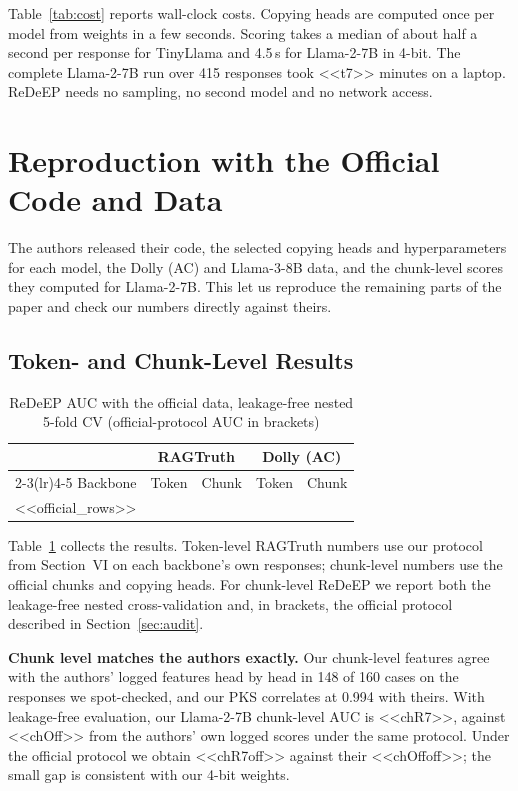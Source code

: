 \documentclass[conference]{IEEEtran}
\begin{document}
Table~\ref{tab:cost} reports wall-clock costs. Copying heads are computed once per model from weights in a few seconds. Scoring takes a median of about half a second per response for TinyLlama and 4.5\,s for Llama-2-7B in 4-bit. The complete Llama-2-7B run over 415 responses took <<t7>> minutes on a laptop. ReDeEP needs no sampling, no second model and no network access.

\section{Reproduction with the Official Code and Data}
\label{sec:official}
The authors released their code, the selected copying heads and hyperparameters for each model, the Dolly (AC) and Llama-3-8B data, and the chunk-level scores they computed for Llama-2-7B. This let us reproduce the remaining parts of the paper and check our numbers directly against theirs.

\subsection{Token- and Chunk-Level Results}
\begin{table}[t]
\caption{ReDeEP AUC with the official data, leakage-free nested 5-fold CV (official-protocol AUC in brackets)}
\label{tab:official}
\centering\footnotesize
\setlength{\tabcolsep}{2.5pt}
\begin{tabular}{@{}lcccc@{}}
\toprule
& \multicolumn{2}{c}{RAGTruth} & \multicolumn{2}{c}{Dolly (AC)} \\
\cmidrule(lr){2-3}\cmidrule(lr){4-5}
Backbone & Token & Chunk & Token & Chunk \\
\midrule
<<official_rows>>
\bottomrule
\end{tabular}
\end{table}

Table~\ref{tab:official} collects the results. Token-level RAGTruth numbers use our protocol from Section~VI on each backbone's own responses; chunk-level numbers use the official chunks and copying heads. For chunk-level ReDeEP we report both the leakage-free nested cross-validation and, in brackets, the official protocol described in Section~\ref{sec:audit}.

\textbf{Chunk level matches the authors exactly.} Our chunk-level features agree with the authors' logged features head by head in 148 of 160 cases on the responses we spot-checked, and our PKS correlates at 0.994 with theirs. With leakage-free evaluation, our Llama-2-7B chunk-level AUC is <<chR7>>, against <<chOff>> from the authors' own logged scores under the same protocol. Under the official protocol we obtain <<chR7off>> against their <<chOffoff>>; the small gap is consistent with our 4-bit weights.
\end{document}
